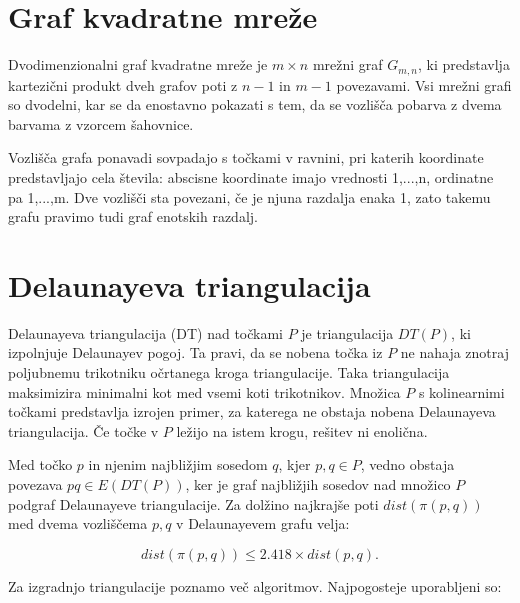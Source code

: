 \documentclass[a4paper, 12pt]{book}
\begin{document}
\section{Graf kvadratne mreže}
\label{grid-chapter}
Dvodimenzionalni graf kvadratne mreže je $m \times n$ mrežni graf $G_{m,n}$, ki predstavlja kartezični produkt dveh grafov poti z $n-1$ in $m-1$ povezavami. Vsi mrežni grafi so dvodelni, kar se da enostavno pokazati s tem, da se vozlišča pobarva z dvema barvama z vzorcem šahovnice.


Vozlišča grafa ponavadi sovpadajo s točkami v ravnini, pri katerih koordinate predstavljajo cela števila: abscisne koordinate imajo vrednosti 1,...,n, ordinatne pa 1,...,m. Dve vozlišči sta povezani, če je njuna razdalja enaka 1, zato takemu grafu pravimo tudi graf enotskih razdalj.


\section{Delaunayeva triangulacija}
Delaunayeva triangulacija (DT) nad točkami $P$ je triangulacija $DT(P)$, ki izpolnjuje Delaunayev pogoj. Ta pravi, da se nobena točka iz $P$ ne nahaja znotraj poljubnemu trikotniku očrtanega kroga triangulacije. Taka triangulacija
maksimizira minimalni kot med vsemi koti trikotnikov. Množica $P$ s kolinearnimi točkami predstavlja izrojen primer, za katerega ne obstaja nobena Delaunayeva triangulacija. Če točke v $P$ ležijo na istem krogu, rešitev ni enolična.

Med točko $p$ in njenim najbližjim sosedom $q$, kjer $p,q\in P$, vedno obstaja povezava $pq\in E(DT(P))$, ker je graf najbližjih sosedov nad množico $P$ podgraf Delaunayeve triangulacije. Za dolžino najkrajše poti $dist(\pi (p,q))$ med dvema 
vozliščema $p,q$ v Delaunayevem grafu velja:

\begin{equation}
dist(\pi (p,q)) \leq 2.418\times dist(p,q).
\end{equation}

Za izgradnjo triangulacije poznamo več algoritmov. Najpogosteje uporabljeni so: 
\end{document}
